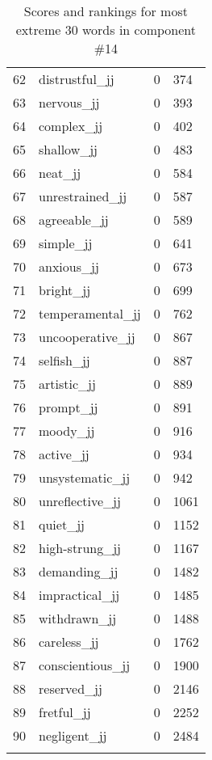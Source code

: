 \begin{longtable}[!htbp]{| rlr@{.}l |}
    62 & distrustful\_jj & 0 & 374 \\
    63 & nervous\_jj & 0 & 393 \\
    64 & complex\_jj & 0 & 402 \\
    65 & shallow\_jj & 0 & 483 \\
    66 & neat\_jj & 0 & 584 \\
    67 & unrestrained\_jj & 0 & 587 \\
    68 & agreeable\_jj & 0 & 589 \\
    69 & simple\_jj & 0 & 641 \\
    70 & anxious\_jj & 0 & 673 \\
    71 & bright\_jj & 0 & 699 \\
    72 & temperamental\_jj & 0 & 762 \\
    73 & uncooperative\_jj & 0 & 867 \\
    74 & selfish\_jj & 0 & 887 \\
    75 & artistic\_jj & 0 & 889 \\
    76 & prompt\_jj & 0 & 891 \\
    77 & moody\_jj & 0 & 916 \\
    78 & active\_jj & 0 & 934 \\
    79 & unsystematic\_jj & 0 & 942 \\
    80 & unreflective\_jj & 0 & 1061 \\
    81 & quiet\_jj & 0 & 1152 \\
    82 & high-strung\_jj & 0 & 1167 \\
    83 & demanding\_jj & 0 & 1482 \\
    84 & impractical\_jj & 0 & 1485 \\
    85 & withdrawn\_jj & 0 & 1488 \\
    86 & careless\_jj & 0 & 1762 \\
    87 & conscientious\_jj & 0 & 1900 \\
    88 & reserved\_jj & 0 & 2146 \\
    89 & fretful\_jj & 0 & 2252 \\
    90 & negligent\_jj & 0 & 2484 \\
    \hline
    \caption{Scores and rankings for most extreme 30 words in component \#14} \\
\end{longtable}
